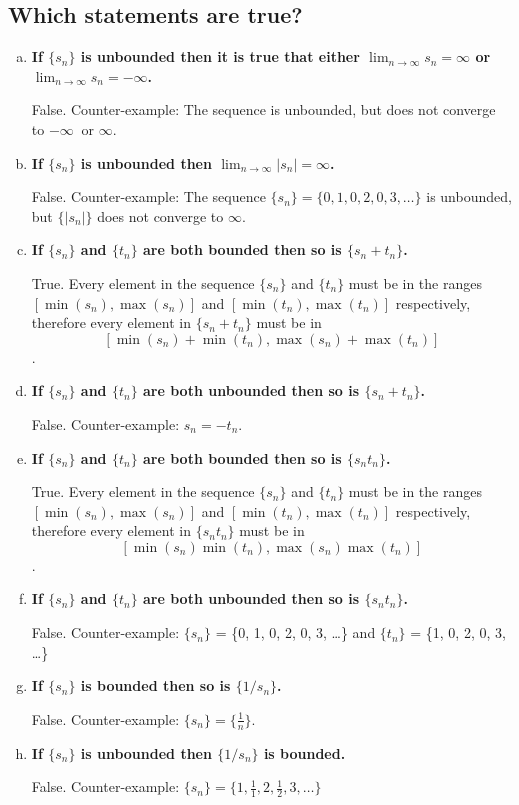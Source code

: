 \documentclass[11pt]{article}
\begin{document}
	\subsection*{Which statements are true?}
	\begin{enumerate}[(a)]
		
		\item \textbf{If $\{s_n\}$ is unbounded then it is true that either $\lim_{n \to \infty} s_n = \infty$ or $\lim_{n \to \infty} s_n = {-\infty}$.}
		
		False. Counter-example: The sequence \myintseq{} is unbounded, but does not converge to $-\infty\ \text{ or } \infty$.
		
		\item \textbf{If $\{s_n\}$ is unbounded then $\lim_{n \to \infty} |s_n| = \infty$.}
		
		False. Counter-example: The sequence $\{s_n\} = \{0, 1, 0, 2, 0, 3,  \dots\}$ is unbounded, but $\{|s_n|\}$ does not converge to $\infty$.
		
		\item \textbf{If $\{s_n\}$ and $\{t_n\}$ are both bounded then so is $\{s_n + t_n\}$.}
		
		True. Every element in the sequence $\{s_n\}$ and $\{t_n\}$ must be in the ranges $[\min(s_n), \max(s_n)]$ and $[\min(t_n), \max(t_n)]$ respectively, therefore every element in $\{s_n + t_n\}$ must be in $$[\min(s_n) + \min(t_n), \max(s_n) + \max(t_n)]$$.
		
		\item \textbf{If $\{s_n\}$ and $\{t_n\}$ are both unbounded then so is $\{s_n + t_n\}$.}
		
		False. Counter-example: $s_n = -t_n$.
		
		\item \textbf{If $\{s_n\}$ and $\{t_n\}$ are both bounded then so is $\{s_nt_n\}$.}
		
		True. Every element in the sequence $\{s_n\}$ and $\{t_n\}$ must be in the ranges $[\min(s_n), \max(s_n)]$ and $[\min(t_n), \max(t_n)]$ respectively, therefore every element in $\{s_nt_n\}$ must be in $$[\min(s_n)\min(t_n), \max(s_n)\max(t_n)]$$. 
		
		\item \textbf{If $\{s_n\}$ and $\{t_n\}$ are both unbounded then so is $\{s_nt_n\}$.}
		
		False. Counter-example: $\{s_n\}$ = \{0, 1, 0, 2, 0, 3, \dots\} and $\{t_n\}$ = \{1, 0, 2, 0, 3, \dots\} 
		
		\item \textbf{If $\{s_n\}$ is bounded then so is $\{1/s_n\}$.}
		
		False. Counter-example: $\{s_n\} = \{\frac{1}{n}\}$.
		
		\item \textbf{If $\{s_n\}$ is unbounded then $\{1/s_n\}$ is bounded.}
		
		False. Counter-example: $\{s_n\} = \{1, \frac{1}{1}, 2, \frac{1}{2}, 3, \dots\}$
		
	\end{enumerate}
	
\end{document}
